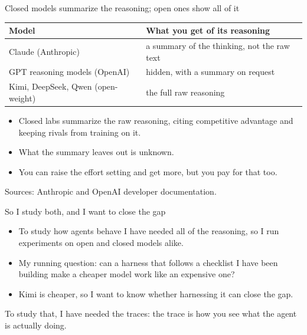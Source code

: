 \documentclass[aspectratio=169,11pt]{beamer}
\begin{document}
\begin{frame}{Closed models summarize the reasoning; open ones show all of it}

\begin{center}
\footnotesize
\begin{tabular}{@{}ll@{}}
\toprule
\textbf{Model} & \textbf{What you get of its reasoning} \\
\midrule
Claude (Anthropic) & a summary of the thinking, not the raw text \\
GPT reasoning models (OpenAI) & hidden, with a summary on request \\
Kimi, DeepSeek, Qwen (open-weight) & the full raw reasoning \\
\bottomrule
\end{tabular}
\end{center}

\vspace{0.3cm}

\begin{itemize}\setlength\itemsep{0.25em}
    \item Closed labs summarize the raw reasoning, citing competitive advantage and keeping rivals from training on it.
    \item What the summary leaves out is unknown.
    \item You can raise the effort setting and get more, but you pay for that too.
\end{itemize}

\vspace{0.2cm}
{\scriptsize\color{warmgray}Sources: Anthropic and OpenAI developer documentation.}

\end{frame}

\begin{frame}{So I study both, and I want to close the gap}

\begin{itemize}\setlength\itemsep{0.35em}
    \item To study how agents behave I have needed all of the reasoning, so I run experiments on open and closed models alike.
    \item My running question: can a harness that follows a checklist I have been building make a cheaper model work like an expensive one?
    \item Kimi is cheaper, so I want to know whether harnessing it can close the gap.
\end{itemize}

\vspace{0.45cm}

\alert{To study that, I have needed the traces: the trace is how you see what the agent is actually doing.}

\end{frame}
\end{document}
